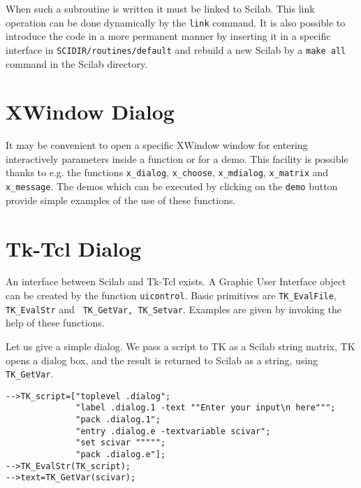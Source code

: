 When such a subroutine is written it must be linked to Scilab.
This link operation can be done dynamically by the {\tt link}
command. It is also possible to introduce the code in a more 
permanent manner by inserting it in a specific interface in 
{\tt SCIDIR/routines/default} and rebuild a new Scilab by a 
{\tt make all} command in the Scilab directory.

\section{XWindow Dialog}
It may be convenient to open a specific XWindow window for entering
interactively parameters inside a function or for a demo.
This facility is possible thanks to e.g. the functions \verb!x_dialog!,
\verb!x_choose!, \verb!x_mdialog!, \verb!x_matrix! and \verb!x_message!.
The demos which can be executed by clicking on the {\tt demo} button
provide simple examples of the use of these functions.

\section{Tk-Tcl Dialog}
An interface between Scilab and Tk-Tcl exists. 
A Graphic User Interface object can be created by the function
\verb!uicontrol!. Basic primitives are \verb!TK_EvalFile!,
\verb!TK_EvalStr! and \verb! TK_GetVar, TK_Setvar!. Examples
are given by invoking the help of these functions.

Let us give a simple dialog. We pass a script to TK as a Scilab
string matrix, TK opens a dialog box, and the result is returned
to Scilab as a string, using \verb!TK_GetVar!.
\begin{verbatim}
-->TK_script=["toplevel .dialog";
              "label .dialog.1 -text ""Enter your input\n here""";
              "pack .dialog.1";
              "entry .dialog.e -textvariable scivar";
              "set scivar """"";
              "pack .dialog.e"];
-->TK_EvalStr(TK_script);
-->text=TK_GetVar(scivar);
\end{verbatim}

